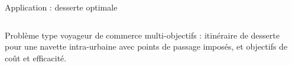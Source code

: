 \documentclass{beamer}
\begin{document}
\begin{frame}{}
\begin{columns}[t]
\begin{column}{.49\textwidth}
      \end{column}
      
      
      
      \begin{column}{.49\textwidth}
      
      \vspace{-1cm}
      
       \begin{block}{Application : desserte optimale}
        \vspace{-1.5cm}
          \begin{columns}[t]
        \begin{column}{.95\textwidth}
       \begin{justify} Problème type voyageur de commerce multi-objectifs : itinéraire de desserte pour une navette intra-urbaine avec points de passage imposés, et objectifs de coût et efficacité.
       \end{justify}
         
          \vspace{1cm}
          

\end{column}
\end{columns}
\end{block}
\end{column}
\end{columns}
\end{frame}
\end{document}
